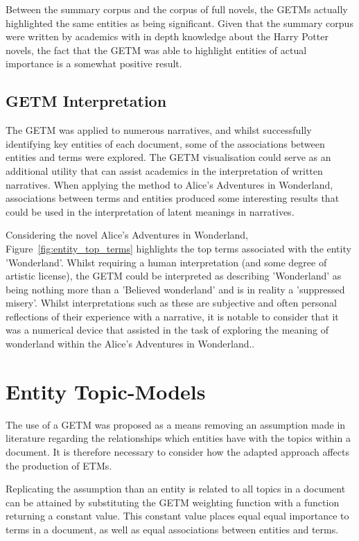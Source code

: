 \documentclass[10pt]{report}
\begin{document}
Between the summary corpus and the corpus of full novels, the GETMs actually highlighted the same entities as being significant. Given that the summary corpus were written by academics with in depth knowledge about the Harry Potter novels, the fact that the GETM was able to highlight entities of actual importance is a somewhat positive result.

\subsection{GETM Interpretation}
The GETM was applied to numerous narratives, and whilst successfully identifying key entities of each document, some of the associations between entities and terms were explored. The GETM visualisation could serve as an additional utility that can assist academics in the interpretation of written narratives. When applying the method to Alice's Adventures in Wonderland, associations between terms and entities produced some interesting results that could be used in the interpretation of latent meanings in narratives.

Considering the novel Alice's Adventures in Wonderland, Figure~\ref{fig:entity_top_terms} highlights the top terms associated with the entity 'Wonderland'. Whilst requiring a human interpretation (and some degree of artistic license), the GETM could be interpreted as describing 'Wonderland' as being nothing more than a 'Believed wonderland' and is in reality a 'suppressed misery'. Whilst interpretations such as these are subjective and often personal reflections of their experience with a narrative, it is notable to consider that it was a numerical device that assisted in the task of exploring the meaning of wonderland within the Alice's Adventures in Wonderland..

\clearpage
\section{Entity Topic-Models}
The use of a GETM was proposed as a means removing an assumption made in literature regarding the relationships which entities have with the topics within a document. It is therefore necessary to consider how the adapted approach affects the production of ETMs.

Replicating the assumption than an entity is related to all topics in a document can be attained by substituting the GETM weighting function with a function returning a constant value. This constant value places equal equal importance to terms in a document, as well as equal associations between entities and terms.
\end{document}
